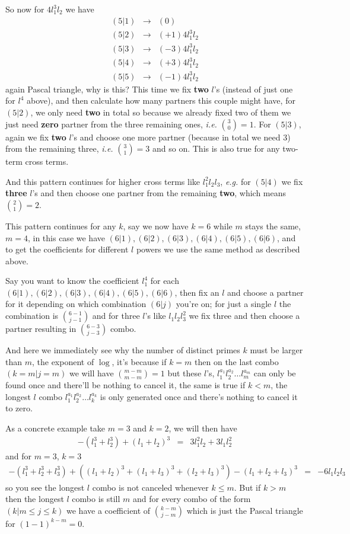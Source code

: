 \documentclass[aps,preprint,preprintnumbers,nofootinbib,showpacs,prd]{revtex4-1}
\newcommand{\ie}{{\it i.e.} }
\newcommand{\eg}{{\it e.g.} }
\newcommand{\nbea}{\begin{eqnarray*}}
\newcommand{\neea}{\end{eqnarray*}}
\begin{document}
So now for $4l_1^3l_2$ we have
%
\nbea
(5|1) & \to & (0) \\
(5|2) & \to & (+1)4l_1^3l_2 \\
(5|3) & \to & (-3)4l_1^3l_2 \\
(5|4) & \to & (+3)4l_1^3l_2 \\
(5|5) & \to & (-1)4l_1^3l_2
\neea
%
again Pascal triangle, why is this? This time we fix {\bf two} $l$'s (instead of just one for $l^4$ above), and then calculate how many partners this couple might have, for $(5|2)$, we only need {\bf two} in total so because we already fixed two of them we just need {\bf zero} partner from the three remaining ones, \ie ${3 \choose 0} = 1$. For $(5|3)$, again we fix {\bf two} $l$'s and choose one more partner (because in total we need 3) from the remaining three, \ie ${3 \choose 1} = 3$ and so on. This is also true for any two-term cross terms.

And this pattern continues for higher cross terms like $l_1^2l_2l_3$, \eg for $(5|4)$ we fix {\bf three} $l$'s and then choose one partner from the remaining {\bf two}, which means ${2 \choose 1} = 2$.

This pattern continues for any $k$, say we now have $k=6$ while $m$ stays the same, $m=4$, in this case we have $(6|1),(6|2),(6|3),(6|4),(6|5),(6|6)$, and to get the coefficients for different $l$ powers we use the same method as described above.

Say you want to know the coefficient $l_1^4$ for each $(6|1),(6|2),(6|3),(6|4),(6|5),(6|6)$, then fix an $l$ and choose a partner for it depending on which combination $(6|j)$ you're on; for just a single $l$ the combination is ${6-1\choose j-1}$ and for three $l$'s like $l_1l_2l_3^2$ we fix three and then choose a partner resulting in ${6-3 \choose j-3}$ combo.

And here we immediately see why the number of distinct primes $k$ must be larger than $m$, the exponent of $\log$, it's because if $k = m$ then on the last combo $(k=m|j=m)$ we will have ${m-m\choose m-m} = 1$ but these $l$'s, $l_1^{a_1}l_2^{a_2}\ldots l_m^{a_m}$ can only be found once and there'll be nothing to cancel it, the same is true if $k < m$, the longest $l$ combo $l_1^{a_1}l_2^{a_2}\ldots l_k^{a_k}$ is only generated once and there's nothing to cancel it to zero.

As a concrete example take $m=3$ and $k=2$, we will then have
%
\nbea
-(l_1^3 + l_2^3) + (l_1+l_2)^3 & = & 3l_1^2l_2 + 3l_1l_2^2
\neea
%
and for $m=3$, $k=3$
%
\nbea
-(l_1^3 + l_2^3 + l_3^3) + ((l_1+l_2)^3 + (l_1+l_3)^3 + (l_2+l_3)^3) - (l_1 + l_2 + l_3)^3 & = & -6l_1l_2l_3
\neea
%
so you see the longest $l$ combo is not canceled whenever $k \le m$. But if $k > m$ then the longest $l$ combo is still $m$ and for every combo of the form $(k|m \le j \le k)$ we have a coefficient of ${k-m\choose j - m}$ which is just the Pascal triangle for $(1-1)^{k-m} = 0$.
\end{document}
